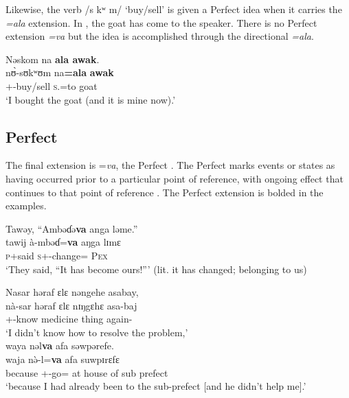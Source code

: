 Likewise, the verb /s kʷ m/ ‘buy/sell’ is given a Perfect idea when it carries the \textit{=ala} extension. In , the goat has come to the speaker. There is no Perfect extension \textit{=va} but the idea is accomplished through the directional \textit{=ala}.

\ea\label{ex:7:123}
Nəskom  na  \textbf{ala  awak}.\\
\gll  n\`ʊ-sʊkʷʊm    na\textbf{=ala}  \textbf{awak}\\
      {\oneS}+{\PFV}-buy/sell  \textsc{s}.{\DO}=to  goat\\
\glt  ‘I bought the goat (and it is mine now).’\\
\z 
{}
\subsection{Perfect}\label{sec:7.5.3}
\hypertarget{RefHeading1212381525720847}{}
The final extension is =\textit{va}, the Perfect \citep{FriesenMamalis2008}. The Perfect marks events or states as having occurred prior to a particular point of reference, with ongoing effect that continues to that point of reference \citep{Comrie1976}. The Perfect extension is bolded in the examples. 

\clearpage
\ea\label{ex:7:124}
Tawəy, “Ambəɗə\textbf{va} anga  ləme.”\\
\gll  tawij     à-mbəɗ=\textbf{va}  aŋga  lɪmɛ\\
      \textsc{p}+said    \textsc{s}+{\PFV}-change={\PRF}  {\POSS}  \textsc{Pex}\\
\glt  ‘They said, “It has become ours!”’ (lit. it has changed; belonging to us)\\
\z 

\ea\label{ex:7:125}
Nasar  həraf  ɛlɛ  nəngehe  asabay, \\
\gll  nà-sar      həraf  ɛlɛ nɪŋgɛhɛ asa-baj \\ 
      {\oneS}+{\PFV}-know  medicine  thing {\DEM} again-{\NEG} \\ 
\glt ‘I didn’t know how to resolve the problem,’ \\     
      
      \medskip
waya  nəl\textbf{va} afa səwpərefe.\\
\gll waja  n\`ə-l=\textbf{va} afa suwpɪrɛfɛ\\
     because  {\oneS}+{\PFV}-go={\PRF}    {at house of}   {sub prefect}\\
\glt  ‘because I had already been to the sub-prefect [and he didn’t help me].’\\
\z 

